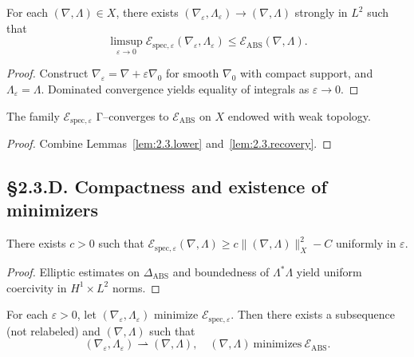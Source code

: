 \begin{lemma}\label{lem:2.3.recovery}
For each $(\nabla,\Lambda)\in X$, there exists $(\nabla_\varepsilon,\Lambda_\varepsilon)\to(\nabla,\Lambda)$ strongly in $L^2$ such that
\[
\limsup_{\varepsilon\to0}\mathcal{E}_{\mathrm{spec},\varepsilon}(\nabla_\varepsilon,\Lambda_\varepsilon)
\le\mathcal{E}_{\mathrm{ABS}}(\nabla,\Lambda).
\]
\end{lemma}

\begin{proof}
Construct $\nabla_\varepsilon=\nabla+\varepsilon\nabla_0$ for smooth $\nabla_0$ with compact support, and $\Lambda_\varepsilon=\Lambda$.  
Dominated convergence yields equality of integrals as $\varepsilon\to0$.
\end{proof}

\begin{theorem}\label{thm:2.3.gamma}
The family $\mathcal{E}_{\mathrm{spec},\varepsilon}$ Γ–converges to $\mathcal{E}_{\mathrm{ABS}}$ on $X$ endowed with weak topology.
\end{theorem}

\begin{proof}
Combine Lemmas~\ref{lem:2.3.lower} and~\ref{lem:2.3.recovery}.
\end{proof}

\subsection*{§2.3.D. Compactness and existence of minimizers}

\begin{lemma}\label{lem:2.3.coercive}
There exists $c>0$ such that 
$\mathcal{E}_{\mathrm{spec},\varepsilon}(\nabla,\Lambda)\ge c\|(\nabla,\Lambda)\|_{X}^2 - C$ uniformly in $\varepsilon$.
\end{lemma}

\begin{proof}
Elliptic estimates on $\Delta_{\mathrm{ABS}}$ and boundedness of $\Lambda^\ast\Lambda$ yield uniform coercivity in $H^1\times L^2$ norms.
\end{proof}

\begin{theorem}\label{thm:2.3.min}
For each $\varepsilon>0$, let $(\nabla_\varepsilon,\Lambda_\varepsilon)$ minimize $\mathcal{E}_{\mathrm{spec},\varepsilon}$.  
Then there exists a subsequence (not relabeled) and $(\nabla,\Lambda)$ such that
\[
(\nabla_\varepsilon,\Lambda_\varepsilon)\rightharpoonup(\nabla,\Lambda),\quad
(\nabla,\Lambda)\ \text{minimizes}\ \mathcal{E}_{\mathrm{ABS}}.
\]
\end{theorem}

